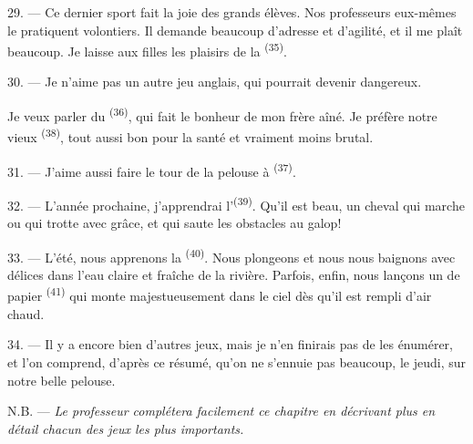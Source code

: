 29. --- Ce dernier sport fait la joie des grands élèves. Nos professeurs
eux-mêmes le pratiquent volontiers. Il demande beaucoup d'adresse et
d'agilité, et il me plaît beaucoup. Je laisse aux filles les plaisirs de la
\textsuperscript{(35)}.

30. --- Je n'aime pas un autre jeu anglais, qui pourrait devenir dangereux.

Je veux parler du \textsuperscript{(36)}, qui fait le bonheur de
mon frère aîné. Je préfère notre vieux \textsuperscript{(38)}, tout aussi bon pour la santé et vraiment moins
brutal.

\VUsaut{4.6mm}
\VUsaut{3.0mm}

31. --- J'aime aussi faire le tour de la pelouse à
\textsuperscript{(37)}.

32. --- L'année prochaine, j'apprendrai
l'\textsuperscript{(39)}. Qu'il est beau, un cheval qui
marche ou qui trotte avec grâce, et qui saute les obstacles au galop!

33. --- L'été, nous apprenons la \textsuperscript{(40)}. Nous
plongeons et nous nous baignons avec délices dans l'eau claire et fraîche de la
rivière. Parfois, enfin, nous lançons un  de papier
\textsuperscript{(41)} qui monte majestueusement dans le ciel dès qu'il est
rempli d'air chaud.

34. --- Il y a encore bien d'autres jeux, mais je n'en finirais pas de les
énumérer, et l'on comprend, d'après ce résumé, qu'on ne s'ennuie pas beaucoup,
le jeudi, sur notre belle pelouse.

N.B. --- \textit{Le professeur complétera facilement ce chapitre en décrivant
plus en détail chacun des jeux les plus importants.}
\VUsaut{6.0mm}
\VUfilet{22mm}
